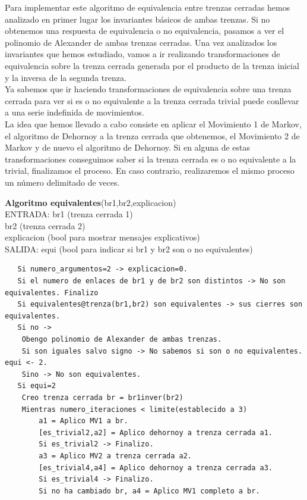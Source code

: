 Para implementar este algoritmo de equivalencia entre trenzas cerradas hemos analizado en primer lugar los invariantes básicos de ambas trenzas. Si no obtenemos una respuesta de equivalencia  o no equivalencia, pasamos a ver el polinomio de Alexander de ambas trenzas cerradas. Una vez analizados los invariantes que hemos estudiado, vamos a ir realizando transformaciones de equivalencia sobre la trenza cerrada generada por el producto de la trenza inicial y la inversa de la segunda trenza. \\

Ya sabemos que ir haciendo transformaciones de equivalencia sobre una trenza cerrada para ver si es o no equivalente a la trenza cerrada trivial puede conllevar a una serie indefinida de movimientos. \\

La idea que hemos llevado a cabo consiste en aplicar el Movimiento 1 de Markov, el algoritmo de Dehornoy a la trenza cerrada que obtenemos, el Movimiento 2 de Markov y de nuevo el algoritmo de Dehornoy. Si en alguna de estas transformaciones conseguimos saber si la trenza cerrada es o no equivalente a la trivial, finalizamos el proceso. En caso contrario, realizaremos el mismo proceso un número delimitado de veces. \\

\newpage
\begin{alg}
	\textbf{Algoritmo equivalentes}(br1,br2,explicacion)\\
	ENTRADA: br1 (trenza cerrada 1)\\
	\hspace*{2.2cm} br2 (trenza cerrada 2)\\
	\hspace*{2.2cm} explicacion (bool para mostrar mensajes explicativos)\\
	SALIDA: \hspace{0.4cm} equi (bool para indicar si br1 y br2 son o no equivalentes)
	
\begin{lstlisting}
   Si numero_argumentos=2 -> explicacion=0.
   Si el numero de enlaces de br1 y de br2 son distintos -> No son equivalentes. Finalizo
   Si equivalentes@trenza(br1,br2) son equivalentes -> sus cierres son equivalentes.
   Si no ->   
   	Obengo polinomio de Alexander de ambas trenzas.
	Si son iguales salvo signo -> No sabemos si son o no equivalentes. equi <- 2.
	Sino -> No son equivalentes.
   Si equi=2
    Creo trenza cerrada br = br1inver(br2)
    Mientras numero_iteraciones < limite(establecido a 3)
	    a1 = Aplico MV1 a br.
	    [es_trivial2,a2] = Aplico dehornoy a trenza cerrada a1. 
	    Si es_trivial2 -> Finalizo.
	    a3 = Aplico MV2 a trenza cerrada a2.
	    [es_trivial4,a4] = Aplico dehornoy a trenza cerrada a3. 
	    Si es_trivial4 -> Finalizo.
	    Si no ha cambiado br, a4 = Aplico MV1 completo a br. 
	   
\end{lstlisting}
\end{alg}

